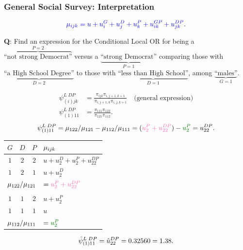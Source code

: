 \documentclass[oneside]{book}\usepackage[]{graphicx}\usepackage[svgnames]{xcolor}
\let\exp\relax%
\let\log\relax%
\begin{document}
\subsubsection*{General Social Survey: Interpretation}
\[ \textcolor{Blue}{\log{\mu_{ijk}}=u+u_i^G+u_j^D+u_k^P+u_{ik}^{GP}+u_{jk}^{DP}}. \]
\begin{Example}{}
    \textbf{Q}: Find an expression for the Conditional Local OR for being a $ \overbrace{\text{``not strong Democrat''}}^{P=2} $
    versus a $ \underbrace{\text{``strong Democrat''}}_{P=1} $ comparing those with $ \underbrace{\text{``a High School Degree''}}_{D=2} $
    to those with $ \underbrace{\text{``less than High School''}}_{D=1} $, among $ \underbrace{\text{``males''}}_{G=1} $.
\end{Example}
\begin{align*}
    \psi_{(i)jk}^{L\; DP} & =\frac{\pi_{ijk}\pi_{i,j+1,k+1}}{\pi_{i,j+1,k}\pi_{i,j,k+1}}\quad\text{(general expression)} \\
    \psi_{(1)11}^{L\; DP} & =\frac{\pi_{111}\pi_{122}}{\pi_{121}\pi_{112}}.
\end{align*}
\[ \log{\psi_{(1)11}^{L\; DP}}=\log{\mu_{122}/\mu_{121}}-\log{\mu_{112}/\mu_{111}}=(\textcolor{HotPink}{u_2^P+u_{22}^{DP}})-\textcolor{Green}{u_2^P}=u_{22}^{DP}. \]
\begin{table}[H]
    \centering
    \begin{tabular}{cccl}
        $ G $                                             & $ D $                                       & $ P $ & $ \log{\mu_{ijk}} $           \\
        \midrule
        $ 1 $                                             & $ 2 $                                       & $ 2 $ & $ u+u_2^D+u_2^P+u_{22}^{DP} $ \\
        $ 1 $                                             & $ 2 $                                       & $ 1 $ & $ u+u_2^D $                   \\
        \midrule
        \multicolumn{3}{c}{$ \log{\mu_{122}/\mu_{121}} $} & $ =\textcolor{HotPink}{u_2^P+u_{22}^{DP}} $                                         \\\\
        \midrule
        $ 1 $                                             & $ 1 $                                       & $ 2 $ & $ u+u_2^P $                   \\
        $ 1 $                                             & $ 1 $                                       & $ 1 $ & $ u $                         \\
        \midrule
        \multicolumn{3}{c}{$ \log{\mu_{112}/\mu_{111}} $} & $ =\textcolor{Green}{u_2^P} $
    \end{tabular}
\end{table}
\[ \hat{\psi}_{(1)11}^{L\;DP}=\exp{\hat{u}_{22}^{DP}}=\exp{0.32560}=1.38. \]
\end{document}
